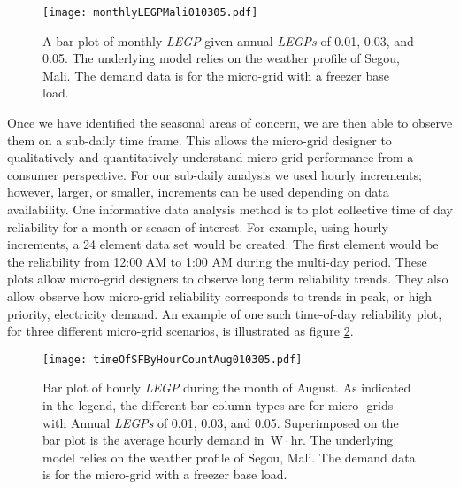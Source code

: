 \documentclass{article}
\newcommand{\unit}[1]{\ensuremath{\, \mathrm{#1}}}
\begin{document}

\begin{figure}[ht] 
  \centering
    \texttt{[image: monthlyLEGPMali010305.pdf]}
  \caption{A bar plot of monthly \emph{LEGP} given annual \emph{LEGPs} of 0.01, 0.03, and 0.05. 
  The underlying model relies on the weather profile of Segou, Mali.
  The demand data is for the micro-grid with a freezer base load. }
\label{MonthBar}
\end{figure}


Once we have identified the seasonal areas of concern, we are then able to observe them on a sub-daily time frame. 
This allows the micro-grid designer to qualitatively and quantitatively understand micro-grid performance from a consumer perspective. 
For our sub-daily analysis we used hourly increments; however, larger, or smaller, increments can be used depending on data availability.
%
%
One informative data analysis method is to plot collective time of day reliability for a month or season of interest. 
For example, using hourly increments, a 24 element data set would be created.
The first element would be the reliability from 12:00 AM to 1:00 AM during the multi-day period.
These plots allow micro-grid designers to observe long term reliability trends.
They also allow observe how micro-grid reliability corresponds to trends in peak, or high priority, electricity demand. 
An example of one such time-of-day reliability plot, for three different micro-grid scenarios, is illustrated as figure \ref{HourBar}.


\begin{figure}[ht] 
  \centering
    \texttt{[image: timeOfSFByHourCountAug010305.pdf]}
  \caption{Bar plot of hourly \emph{LEGP} during the month of August. 
  As indicated in the legend, the different bar column types are for micro-	
  grids with Annual \emph{LEGPs} of 0.01, 0.03, and 0.05.
  Superimposed on the bar plot is the average hourly demand in \unit{W\! \cdot \! hr}.
  The underlying model relies on the weather profile of Segou, Mali.
  The demand data is for the micro-grid with a freezer base load.}
\label{HourBar}
\end{figure}

\end{document}
